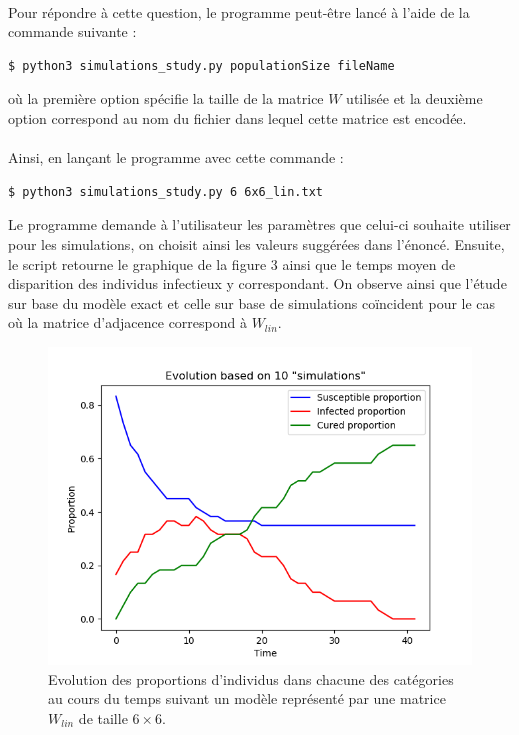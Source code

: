 \documentclass[a4paper, 12pt, oneside]{article}
\begin{document}
\paragraph{}Pour répondre à cette question, le programme peut-être lancé à l'aide de la commande suivante :
\begin{lstlisting}[language=bash]
$ python3 simulations_study.py populationSize fileName 
\end{lstlisting}
\noindent où la première option spécifie la taille de la matrice $W$ utilisée et la deuxième option correspond au nom du fichier dans lequel cette matrice est encodée.

\paragraph{}Ainsi, en lançant le programme avec cette commande :

\begin{lstlisting}[language=bash]
$ python3 simulations_study.py 6 6x6_lin.txt 
\end{lstlisting}

\noindent Le programme demande à l'utilisateur les paramètres que celui-ci souhaite utiliser pour les simulations, on choisit ainsi les valeurs suggérées dans l'énoncé. Ensuite, le script retourne le graphique de la figure 3 ainsi que le temps moyen de disparition des individus infectieux y correspondant. On observe ainsi que l'étude sur base du modèle exact et celle sur base de simulations coïncident pour le cas où la matrice d'adjacence correspond à $W_{lin}$.

\begin{figure}[H]
	\centering
	\includegraphics[scale=1]{lin_6x6_simulations.png} 
	\caption{Evolution des proportions d'individus dans chacune des catégories au cours du temps suivant un modèle représenté par une matrice $W_{lin}$ de taille $6 \times 6$.}
\end{figure}
\end{document}
